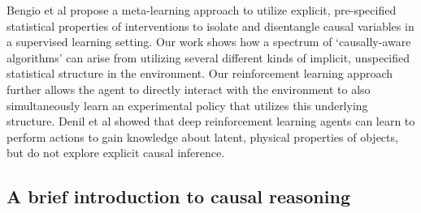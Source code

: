 
Bengio et al \citep{bengio2019meta} propose a meta-learning approach to utilize explicit, pre-specified statistical properties of interventions to isolate and disentangle causal variables in a supervised learning setting. Our work shows how a spectrum of `causally-aware algorithms' can arise from utilizing several different kinds of implicit, unspecified statistical structure in the environment. Our reinforcement learning approach further allows the agent to directly interact with the environment to also simultaneously learn an experimental policy that utilizes this underlying structure. Denil et al \citep{denil2016learning} showed that deep reinforcement learning agents can learn to perform actions to gain knowledge about latent, physical properties of objects, but do not explore explicit causal inference.

\subsection{A brief introduction to causal reasoning}



